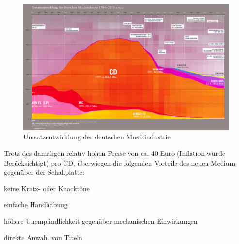 \begin{figure}[h]
  \begin{center}
      \begin{minipage}[t]{\textwidth}
        \begin{center}
            \includegraphics[width=\textwidth]{Bilder/Optische_Datentraeger_Die_Compact_Disc/Geschichte/umsatzcd.png}
            \caption[Umsatzentwicklung der deutschen Musikindustrie \newline \url{http://www.musikindustrie.de/uploads/media/140325\_BVMI\_2013\_Jahrbuch\_ePaper\_V02.pdf} S. 7 (zuletzt aufgerufen am 03.08.2015)]{Umsatzentwicklung der deutschen Musikindustrie}
            \label{fig:umsatzcd}
        \end{center}
      \end{minipage}
  \end{center}
\end{figure}

Trotz des damaligen relativ hohen Preise von ca. 40 Euro (Inflation wurde Berücksichtigt) pro CD, überwiegen die folgenden Vorteile des neuen Medium gegenüber der Schallplatte:
\begin{itemize*}
    \item keine Kratz- oder Knacktöne
    \item einfache Handhabung
    \item höhere Unempfindlichkeit gegenüber mechanischen Einwirkungen
    \item direkte Anwahl von Titeln
\end{itemize*}
